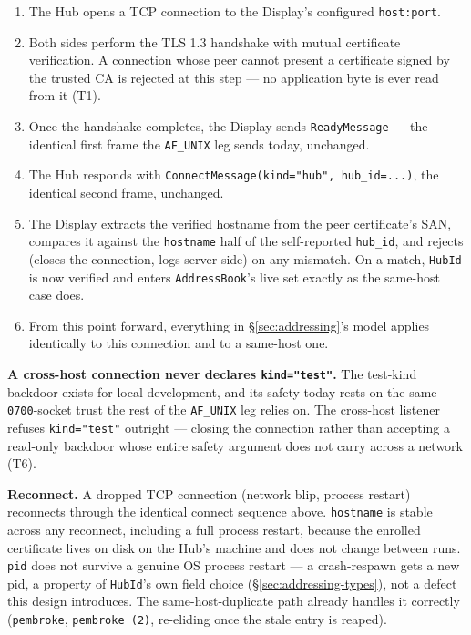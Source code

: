 \documentclass[a4paper,10pt]{article}
\newcommand{\msg}[1]{\texttt{#1}}
\newcommand{\field}[1]{\texttt{#1}}
\begin{document}
\begin{enumerate}
  \item The Hub opens a TCP connection to the Display's configured
    \field{host:port}.
  \item Both sides perform the TLS 1.3 handshake with mutual certificate
    verification.  A connection whose peer cannot present a certificate
    signed by the trusted CA is rejected at this step --- no application
    byte is ever read from it (T1).
  \item Once the handshake completes, the Display sends \msg{ReadyMessage}
    --- the identical first frame the \field{AF\_UNIX} leg sends today,
    unchanged.
  \item The Hub responds with \texttt{ConnectMessage(kind="hub",
    hub\_id=...)}, the identical second frame, unchanged.
  \item The Display extracts the verified hostname from the peer
    certificate's SAN, compares it against the \field{hostname} half of
    the self-reported \field{hub\_id}, and rejects (closes the connection,
    logs server-side) on any mismatch.  On a match, \texttt{HubId} is now
    verified and enters \texttt{AddressBook}'s live set exactly as the
    same-host case does.
  \item From this point forward, everything in \S\ref{sec:addressing}'s
    model applies identically to this connection and to a same-host one.
\end{enumerate}

\textbf{A cross-host connection never declares \texttt{kind="test"}.}  The
test-kind backdoor exists for local development, and its safety today
rests on the same \texttt{0700}-socket trust the rest of the
\field{AF\_UNIX} leg relies on.  The cross-host listener refuses
\texttt{kind="test"} outright --- closing the connection rather than
accepting a read-only backdoor whose entire safety argument does not carry
across a network (T6).

\textbf{Reconnect.}  A dropped TCP connection (network blip, process
restart) reconnects through the identical connect sequence above.
\field{hostname} is stable across any reconnect, including a full process
restart, because the enrolled certificate lives on disk on the Hub's
machine and does not change between runs.  \field{pid} does not survive a
genuine OS process restart --- a crash-respawn gets a new pid, a property
of \texttt{HubId}'s own field choice (\S\ref{sec:addressing-types}), not a
defect this design introduces.  The same-host-duplicate path already
handles it correctly (\texttt{pembroke}, \texttt{pembroke (2)}, re-eliding
once the stale entry is reaped).
\end{document}
